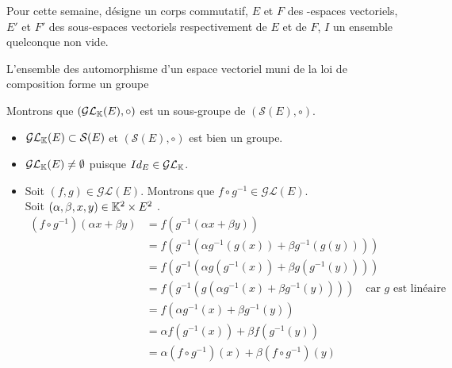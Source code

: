 \documentclass{article}
\renewenvironment{question_kholle}[2][ ]
{
	\subsection{\texorpdfstring{#2}{}}
	\notblank{#1}
	{
		\noindent #1
		\bigbreak
	}
	{}
	\begin{proof}
}
{
	\end{proof}
}
\begin{document}
Pour cette semaine, \K désigne un corps commutatif, $E$ et $F$ des \K\!\!-espaces vectoriels, $E'$ et $F'$ des sous-espaces vectoriels respectivement de $E$ et de $F$, $I$ un ensemble quelconque non vide.

\begin{question_kholle}
  {L'ensemble des automorphisme d'un espace vectoriel muni de la loi de composition forme un groupe}

  Montrons que $(\mathcal{GL}_{\mathbb K}(E), \circ)$ est un sous-groupe de $(\mathcal{S}(E), \circ)$.
  \begin{itemize}
    \item $\mathcal{GL}_{\mathbb K}(E) \subset \mathcal{S}(E)$ et $(\mathcal{S}(E), \circ)$ est bien un groupe.
    \item $\mathcal{GL}_{\mathbb K}(E) \neq \emptyset$ puisque $Id_E \in \mathcal{GL}_{\mathbb K}$.
    \item Soit $(f, g) \in \mathcal{GL}(E)$. Montrons que $f \circ g^{-1} \in \mathcal{GL}(E)$. \\
          Soit $(\alpha, \beta, x, y) \in \mathbb K^2 \times E^2$ \fqs. \\
          \begin{equation*}
            \begin{aligned}
              \left(f \circ g^{-1}\right) \left(\alpha x + \beta y\right)
               & = f \left( g^{-1} \left(\alpha x + \beta y\right) \right)                                                                             \\
               & = f \left( g^{-1} \left(\alpha g^{-1}(g(x)) + \beta g^{-1}(g(y))\right) \right)                                                       \\
               & = f \left( g^{-1} \left( \alpha g\left(g^{-1}(x)\right) + \beta g\left(g^{-1}(y)\right) \right) \right)                               \\
               & = f \left( g^{-1} \left( g \left( \alpha g^{-1}(x) + \beta g^{-1}(y) \right) \right) \right) \quad \text{car } g \text{ est linéaire} \\
               & = f \left( \alpha g^{-1}(x) + \beta g^{-1}(y) \right)                                                                                 \\
               & = \alpha f \left( g^{-1}(x) \right) + \beta f \left( g^{-1}(y) \right)                                                                \\
               & = \alpha \left(f \circ g^{-1}\right) (x) + \beta \left(f \circ g^{-1}\right) (y)
            \end{aligned}
          \end{equation*}
  \end{itemize}
\end{question_kholle}
\end{document}
